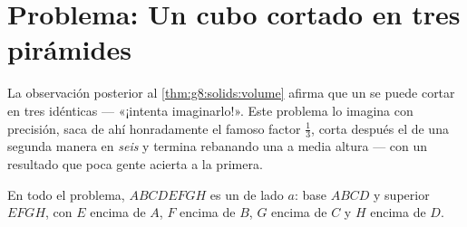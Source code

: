 \section{Problema: Un cubo cortado en tres pirámides}

\begin{problem}
\label{pb:g8:solids:1}
La observación posterior al \cref{thm:g8:solids:volume} afirma que un 
se puede cortar en tres  idénticas --- «¡intenta imaginarlo!».
Este problema lo imagina con precisión, saca de ahí honradamente el famoso factor
$\frac13$, corta después el  de una segunda manera en
\emph{seis}  y termina rebanando una  a media altura ---
con un resultado que poca gente acierta a la primera.

En todo el problema, $ABCDEFGH$ es un  de lado $a$: base $ABCD$ y 
superior $EFGH$, con $E$ encima de $A$, $F$ encima de $B$, $G$ encima de $C$ y
$H$ encima de $D$.


\end{problem}
